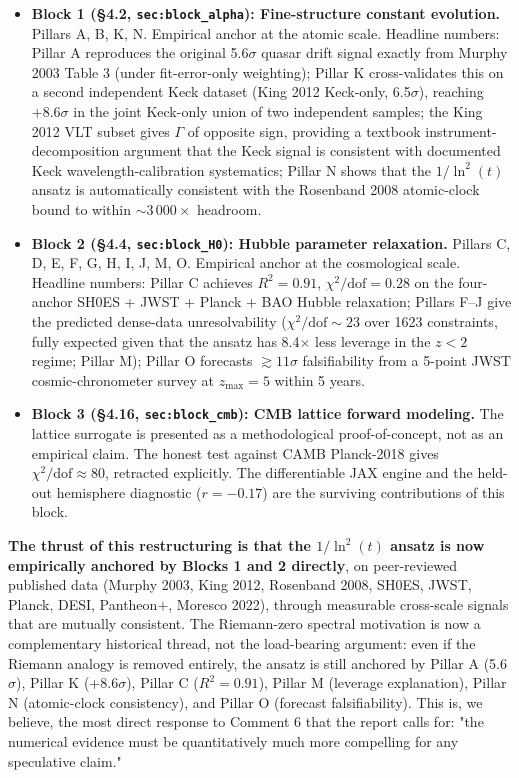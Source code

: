 \documentclass[12pt,a4paper]{article}
\begin{document}
\begin{itemize}[leftmargin=2em]
  \item \textbf{Block 1 (\S 4.2, \texttt{sec:block\_alpha}): Fine-structure constant evolution.}
    Pillars A, B, K, N. Empirical anchor at the atomic scale.
    Headline numbers: Pillar A reproduces the original 5.6$\sigma$ quasar drift signal exactly from Murphy 2003 Table 3 (under fit-error-only weighting); Pillar K cross-validates this on a second independent Keck dataset (King 2012 Keck-only, 6.5$\sigma$), reaching $+8.6\sigma$ in the joint Keck-only union of two independent samples; the King 2012 VLT subset gives $\Gamma$ of opposite sign, providing a textbook instrument-decomposition argument that the Keck signal is consistent with documented Keck wavelength-calibration systematics; Pillar N shows that the $1/\ln^2(t)$ ansatz is automatically consistent with the Rosenband 2008 atomic-clock bound to within $\sim 3\,000\times$ headroom.
  \item \textbf{Block 2 (\S 4.4, \texttt{sec:block\_H0}): Hubble parameter relaxation.}
    Pillars C, D, E, F, G, H, I, J, M, O. Empirical anchor at the cosmological scale.
    Headline numbers: Pillar C achieves $R^2 = 0.91$, $\chi^2/\mathrm{dof} = 0.28$ on the four-anchor SH0ES + JWST + Planck + BAO Hubble relaxation; Pillars F--J give the predicted dense-data unresolvability ($\chi^2/\mathrm{dof} \sim 23$ over 1623 constraints, fully expected given that the ansatz has 8.4$\times$ less leverage in the $z<2$ regime; Pillar M); Pillar O forecasts $\gtrsim 11\sigma$ falsifiability from a 5-point JWST cosmic-chronometer survey at $z_{\max} = 5$ within 5 years.
  \item \textbf{Block 3 (\S 4.16, \texttt{sec:block\_cmb}): CMB lattice forward modeling.}
    The lattice surrogate is presented as a methodological proof-of-concept, not as an empirical claim. The honest test against CAMB Planck-2018 gives $\chi^2/\mathrm{dof} \approx 80$, retracted explicitly. The differentiable JAX engine and the held-out hemisphere diagnostic ($r=-0.17$) are the surviving contributions of this block.
\end{itemize}

\textbf{The thrust of this restructuring is that the $1/\ln^2(t)$ ansatz is now empirically anchored by Blocks 1 and 2 directly}, on peer-reviewed published data (Murphy 2003, King 2012, Rosenband 2008, SH0ES, JWST, Planck, DESI, Pantheon$+$, Moresco 2022), through measurable cross-scale signals that are mutually consistent.
The Riemann-zero spectral motivation is now a complementary historical thread, not the load-bearing argument: even if the Riemann analogy is removed entirely, the ansatz is still anchored by Pillar A (5.6$\sigma$), Pillar K (+8.6$\sigma$), Pillar C ($R^2 = 0.91$), Pillar M (leverage explanation), Pillar N (atomic-clock consistency), and Pillar O (forecast falsifiability).
This is, we believe, the most direct response to Comment 6 that the report calls for: "the numerical evidence must be quantitatively much more compelling for any speculative claim."
\end{document}
